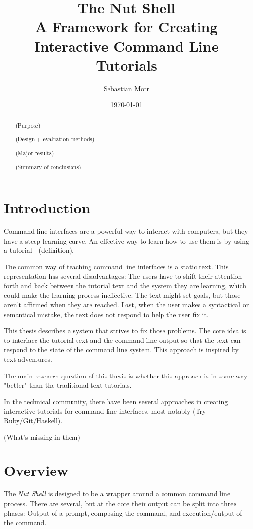 \documentclass[twoside]{scrreprt}
\title{The Nut Shell \\ A Framework for Creating Interactive Command Line Tutorials}
\author{Sebastian Morr}
\date{\today}
\begin{document}
\maketitle

\tableofcontents

\begin{abstract}
(Purpose)

(Design + evaluation methods)

(Major results)

(Summary of conclusions)
\end{abstract}

\chapter{Introduction}

Command line interfaces are a powerful way to interact with computers, but they have a steep learning curve. An effective way to learn how to use them is by using a tutorial - (definition).

The common way of teaching command line interfaces is a static text. This representation has several disadvantages: The users have to shift their attention forth and back between the tutorial text and the system they are learning, which could make the learning process ineffective. The text might set goals, but those aren't affirmed when they are reached. Last, when the user makes a syntactical or semantical mistake, the text does not respond to help the user fix it.

This thesis describes a system that strives to fix those problems. The core idea is to interlace the tutorial text and the command line output so that the text can respond to the state of the command line system. This approach is inspired by text adventures.

The main research question of this thesis is whether this approach is in some way "better" than the traditional text tutorials.

In the technical community, there have been several approaches in creating interactive tutorials for command line interfaces, most notably (Try Ruby/Git/Haskell).

(What's missing in them)

\chapter{Overview}

The \emph{Nut Shell} is designed to be a wrapper around a common command line process. There are several, but at the core their output can be split into three phases: Output of a prompt, composing the command, and execution/output of the command.
\end{document}
